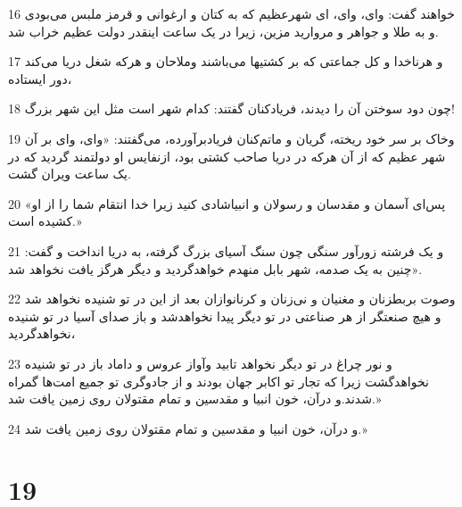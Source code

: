 \par 16 خواهند گفت: وای، وای، ای شهرعظیم که به کتان و ارغوانی و قرمز ملبس می‌بودی و به طلا و جواهر و مروارید مزین، زیرا در یک ساعت اینقدر دولت عظیم خراب شد.
\par 17 و هرناخدا و کل جماعتی که بر کشتیها می‌باشند وملاحان و هر‌که شغل دریا می‌کند دور ایستاده،
\par 18 چون دود سوختن آن را دیدند، فریادکنان گفتند: کدام شهر است مثل این شهر بزرگ!
\par 19 وخاک بر سر خود ریخته، گریان و ماتم‌کنان فریادبرآورده، می‌گفتند: «وای، وای بر آن شهر عظیم که از آن هر‌که در دریا صاحب کشتی بود، ازنفایس او دولتمند گردید که در یک ساعت ویران گشت.
\par 20 «پس‌ای آسمان و مقدسان و رسولان و انبیاشادی کنید زیرا خدا انتقام شما را از او کشیده است.»
\par 21 و یک فرشته زورآور سنگی چون سنگ آسیای بزرگ گرفته، به دریا انداخت و گفت: «چنین به یک صدمه، شهر بابل منهدم خواهدگردید و دیگر هرگز یافت نخواهد شد.
\par 22 وصوت بربطزنان و مغنیان و نی‌زنان و کرنانوازان بعد از این در تو شنیده نخواهد شد و هیچ صنعتگر از هر صناعتی در تو دیگر پیدا نخواهدشد و باز صدای آسیا در تو شنیده نخواهدگردید،
\par 23 و نور چراغ در تو دیگر نخواهد تابید وآواز عروس و داماد باز در تو شنیده نخواهدگشت زیرا که تجار تو اکابر جهان بودند و از جادوگری تو جمیع امت‌ها گمراه شدند.و درآن، خون انبیا و مقدسین و تمام مقتولان روی زمین یافت شد.»
\par 24 و درآن، خون انبیا و مقدسین و تمام مقتولان روی زمین یافت شد.»

\chapter{19}

